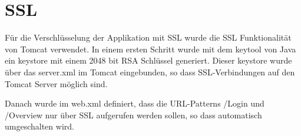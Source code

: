 \documentclass[12pt]{scrartcl}
\begin{document}
\section{SSL}
Für die Verschlüsselung der Applikation mit SSL wurde die SSL Funktionalität von Tomcat verwendet.
In einem ersten Schritt wurde mit dem keytool von Java ein keystore mit einem 2048 bit RSA Schlüssel generiert. Dieser keystore wurde über das server.xml im Tomcat eingebunden, so dass SSL-Verbindungen auf den Tomcat Server möglich sind.

Danach wurde im web.xml definiert, dass die URL-Patterns /Login und /Overview nur über SSL aufgerufen werden sollen, so dass automatisch umgeschalten wird.

\end{document}
